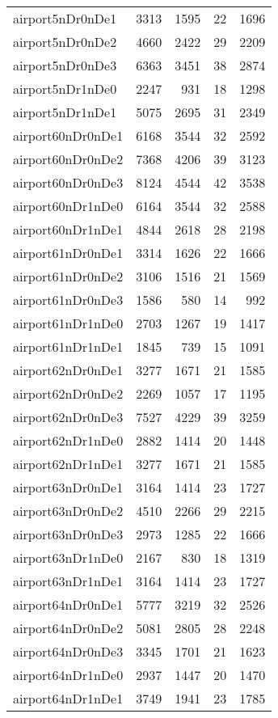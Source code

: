 \documentclass[../../../thesis.tex]{subfiles}
\begin{document}
\begin{longtable}{lrrrr}
airport5nDr0nDe1 & 3313 & 1595 & 22 & 1696 \\
airport5nDr0nDe2 & 4660 & 2422 & 29 & 2209 \\
airport5nDr0nDe3 & 6363 & 3451 & 38 & 2874 \\
airport5nDr1nDe0 & 2247 & 931 & 18 & 1298 \\
airport5nDr1nDe1 & 5075 & 2695 & 31 & 2349 \\
airport60nDr0nDe1 & 6168 & 3544 & 32 & 2592 \\
airport60nDr0nDe2 & 7368 & 4206 & 39 & 3123 \\
airport60nDr0nDe3 & 8124 & 4544 & 42 & 3538 \\
airport60nDr1nDe0 & 6164 & 3544 & 32 & 2588 \\
airport60nDr1nDe1 & 4844 & 2618 & 28 & 2198 \\
airport61nDr0nDe1 & 3314 & 1626 & 22 & 1666 \\
airport61nDr0nDe2 & 3106 & 1516 & 21 & 1569 \\
airport61nDr0nDe3 & 1586 & 580 & 14 & 992 \\
airport61nDr1nDe0 & 2703 & 1267 & 19 & 1417 \\
airport61nDr1nDe1 & 1845 & 739 & 15 & 1091 \\
airport62nDr0nDe1 & 3277 & 1671 & 21 & 1585 \\
airport62nDr0nDe2 & 2269 & 1057 & 17 & 1195 \\
airport62nDr0nDe3 & 7527 & 4229 & 39 & 3259 \\
airport62nDr1nDe0 & 2882 & 1414 & 20 & 1448 \\
airport62nDr1nDe1 & 3277 & 1671 & 21 & 1585 \\
airport63nDr0nDe1 & 3164 & 1414 & 23 & 1727 \\
airport63nDr0nDe2 & 4510 & 2266 & 29 & 2215 \\
airport63nDr0nDe3 & 2973 & 1285 & 22 & 1666 \\
airport63nDr1nDe0 & 2167 & 830 & 18 & 1319 \\
airport63nDr1nDe1 & 3164 & 1414 & 23 & 1727 \\
airport64nDr0nDe1 & 5777 & 3219 & 32 & 2526 \\
airport64nDr0nDe2 & 5081 & 2805 & 28 & 2248 \\
airport64nDr0nDe3 & 3345 & 1701 & 21 & 1623 \\
airport64nDr1nDe0 & 2937 & 1447 & 20 & 1470 \\
airport64nDr1nDe1 & 3749 & 1941 & 23 & 1785 \\

\end{longtable}
\end{document}
